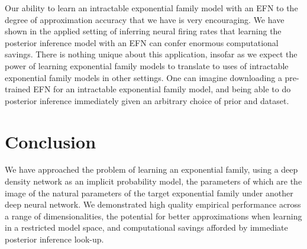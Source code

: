 \documentclass[twoside]{article}
\begin{document}
Our ability to learn an intractable exponential family model with an EFN to the degree of approximation accuracy that we have is very encouraging.  We have shown in the applied setting of inferring neural firing rates that learning the posterior inference model with an EFN can confer enormous computational savings.  There is nothing unique about this application, insofar as we expect the power of learning exponential family models to translate to uses of intractable exponential family models in other settings.  One can imagine downloading a pre-trained EFN for an intractable exponential family model, and being able to do posterior inference immediately given an arbitrary choice of prior and dataset.

\section{Conclusion}

We have approached the problem of learning an exponential family, using a deep density network as an implicit probability model, the parameters of which are the image of the natural parameters of the target exponential family under another deep neural network.  
We demonstrated high quality empirical performance across a range of dimensionalities, the potential for better approximations when learning in a restricted model space, and computational savings afforded by immediate posterior inference look-up.


\end{document}
